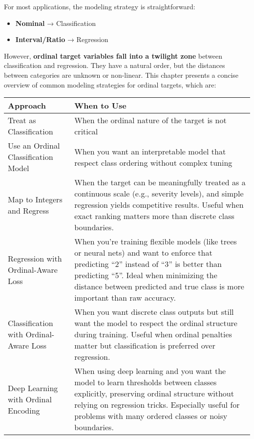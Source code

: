 \documentclass[12pt,openany, draft]{book}
\begin{document}
\vspace{10pt}

For most applications, the modeling strategy is straightforward:
\begin{itemize}
    \item \textbf{Nominal} → Classification
    \item \textbf{Interval/Ratio} → Regression
\end{itemize}

However, \textbf{ordinal target variables fall into a twilight zone} between 
classification and regression. They have a natural order, but the distances 
between categories are unknown or non-linear. This chapter presents a 
concise overview of common modeling strategies for ordinal targets, which are:

\begin{minipage}{\textwidth}
\begin{center}
\renewcommand{\arraystretch}{1.5} %
\begin{tabular}{lp{9cm}}
\toprule
\textbf{Approach} & \textbf{When to Use} \\
\midrule
Treat as Classification & When the ordinal nature of the target is not critical \\
Use an Ordinal Classification Model & When you want an interpretable model that respect class ordering without complex tuning \\
Map to Integers and Regress & When the target can be meaningfully treated as a continuous scale (e.g., severity levels), and simple regression yields competitive results. Useful when exact ranking matters more than discrete class boundaries. \\
Regression with Ordinal-Aware Loss & When you're training flexible models (like trees or neural nets) and want to enforce that predicting “2” instead of “3” is better than predicting “5”. Ideal when minimizing the distance between predicted and true class is more important than raw accuracy. \\
Classification with Ordinal-Aware Loss & When you want discrete class outputs but still want the model to respect the ordinal structure during training. Useful when ordinal penalties matter but classification is preferred over regression. \\
Deep Learning with Ordinal Encoding & When using deep learning and you want the model to learn thresholds between classes explicitly, preserving ordinal structure without relying on regression tricks. Especially useful for problems with many ordered classes or noisy boundaries. \\
\bottomrule
\end{tabular}
\end{center}
\end{minipage}
\end{document}
